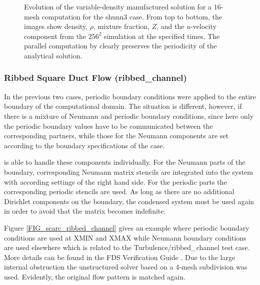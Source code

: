 \begin{figure}[ht]
\caption[Evolution of the variable-density manufactured solution for a 16-mesh \scarc{} computation]{Evolution of the variable-density manufactured solution for a 16-mesh \scarc{} computation for the {\ct shunn3} case.  From top to bottom, the images show density, $\rho$, mixture fraction, $Z$, and the $u$-velocity component from the $256^2$ simulation at the specified times. The parallel computation by \scarc{} clearly preserves the periodicity of the analytical solution.}
\label{FIG_scarc_shunn3}
\end{figure}




\subsubsection{Ribbed Square Duct Flow ({\ct ribbed\_channel})}

In the previous two cases, periodic boundary conditions were applied to the entire boundary of the computational domain. The situation is different, however, if there is a mixture of Neumann and periodic boundary conditions, since here only the periodic boundary values have to be communicated between the corresponding partners, while those for the Neumann components are set according to the boundary specifications of the case.

\scarc{} is able to handle these components individually. For the Neumann parts of the boundary, corresponding Neumann matrix stencils are integrated into the system with according settings of the right hand side. For the periodic parts the corresponding periodic stencils are used.
As long as there are no additional Dirichlet components on the boundary, the condensed system must be used again
in order to avoid that the matrix becomes indefinite. 

Figure \ref{FIG_scarc_ribbed_channel} gives an example where periodic boundary conditions are used at
{\ct XMIN} and {\ct XMAX} while Neumann boundary conditions are used elsewhere which is related to the
Turbulence/ribbed\_channel test case.
More details can be found in the FDS Verification Guide \cite{McGrattan:2018:VG}.
Due to the large internal obstruction the unstructured \uscarc{} solver based on a 4-mesh subdivision was used. Evidently, the original flow pattern is matched again. 

